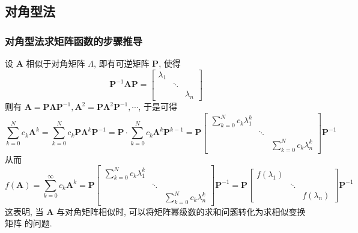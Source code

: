 \subsection{对角型法}

\subsubsection{对角型法求矩阵函数的步骤推导}

设 $\bm{A}$ 相似于对角矩阵 $\Lambda$, 即有可逆矩阵 $\bm{P}$, 使得
$$
    \bm{P}^{-1}\bm{AP} = \begin{bmatrix}
        \lambda_1 &        &           \\
                  & \ddots &           \\
                  &        & \lambda_n
    \end{bmatrix}
$$
则有 $\bm{A} = \bm{P\Lambda P}^{-1}, \bm{A}^2 = \bm{P\Lambda}^2\bm{P}^{-1}, \cdots$, 于是可得
$$
    \sum\limits_{k=0}^N c_k\bm{A}^k = \sum\limits_{k=0}^N c_k\bm{P\Lambda}^k\bm{P}^{-1} = \bm{P \cdot} \sum\limits_{k = 0}^N c_k \bm{\Lambda}^k\bm{P}^{k-1} = \bm{P} \begin{bmatrix}
        \sum\limits_{k = 0}^N c_k \lambda_1^k &        &                                    \\
                                              & \ddots &                                    \\
                                              &        & \sum\limits_{k=0}^N c_k\lambda_n^k
    \end{bmatrix}\bm{P}^{-1}
$$
从而
$$
    f(\bm{A}) = \sum\limits_{k=0}^\infty c_k \bm{A}^k = \bm{P} \begin{bmatrix}
        \sum\limits_{k = 0}^N c_k \lambda_1^k &        &                                    \\
                                              & \ddots &                                    \\
                                              &        & \sum\limits_{k=0}^N c_k\lambda_n^k
    \end{bmatrix}\bm{P}^{-1} = \bm{P} \begin{bmatrix}
        f(\lambda_1) &        &              \\
                     & \ddots &              \\
                     &        & f(\lambda_n)
    \end{bmatrix} \bm{P}^{-1}
$$
这表明, 当 $\bm{A}$ 与对角矩阵相似时, 可以将矩阵幂级数的求和问题转化为求相似变换矩阵
的问题.

